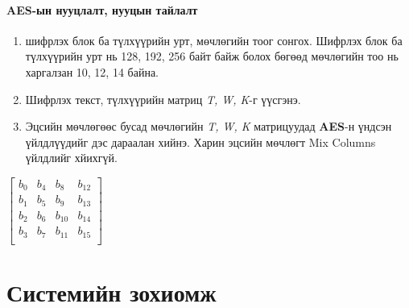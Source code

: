 \subsubsection{AES-ын нууцлалт, нууцын тайлалт}
\begin{enumerate}
	\item шифрлэх блок ба түлхүүрийн урт, мөчлөгийн тоог сонгох. Шифрлэх блок ба түлхүүрийн урт нь 128, 192, 256 байт байж болох бөгөөд мөчлөгийн тоо нь харгалзан 10, 12, 14 байна.
	\item Шифрлэх текст, түлхүүрийн матриц \textit{T, W, K}-г үүсгэнэ.
	\item Эцсийн мөчлөгөөс бусад мөчлөгийн \textit{T, W, K} матрицуудад \textbf{AES}-н үндсэн үйлдлүүдийг дэс дараалан хийнэ. Харин эцсийн мөчлөгт Mix Columns үйлдлийг хйихгүй.
\end{enumerate}
\begin{center}
	$\begin{bmatrix}
		b_{0} & b_{4} & b_{8} & b_{12} \\
		b_{1} & b_{5} & b_{9} & b_{13} \\
		b_{2} & b_{6} & b_{10} & b_{14} \\
		b_{3} & b_{7} & b_{11} & b_{15} \\
		\end{bmatrix}$
\end{center}

\chapter{Системийн зохиомж}